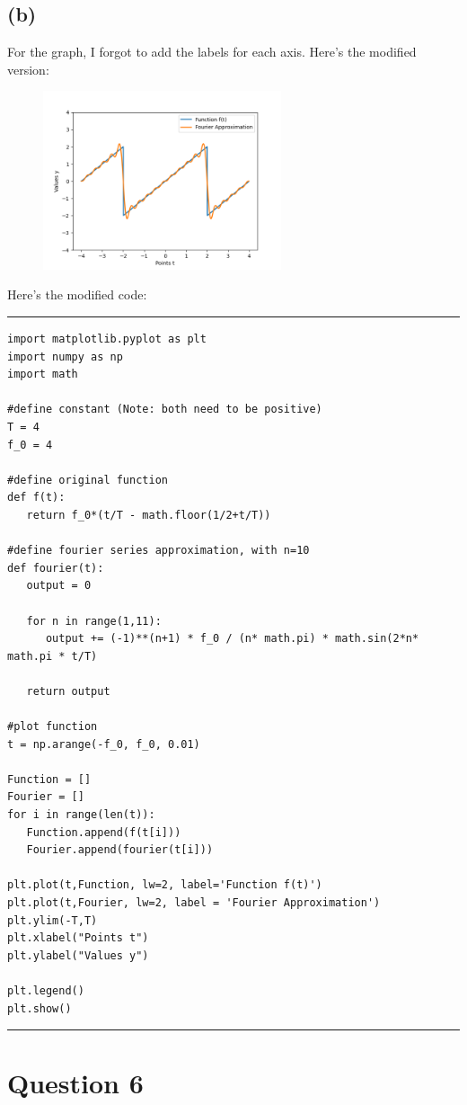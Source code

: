 \documentclass{article}
\begin{document}
\subsection*{(b)}
For the graph, I forgot to add the labels for each axis. Here's the modified version:
\begin{figure}[h!]
    \begin{center}
        \includegraphics[width=70mm]{Figure_1.png}
    \end{center}
\end{figure}
Here's the modified code:
\rule{15.6cm}{0.1mm}
\begin{verbatim}
import matplotlib.pyplot as plt
import numpy as np
import math

#define constant (Note: both need to be positive)
T = 4
f_0 = 4

#define original function
def f(t):
   return f_0*(t/T - math.floor(1/2+t/T))

#define fourier series approximation, with n=10
def fourier(t):
   output = 0

   for n in range(1,11):
      output += (-1)**(n+1) * f_0 / (n* math.pi) * math.sin(2*n* math.pi * t/T)

   return output

#plot function
t = np.arange(-f_0, f_0, 0.01)

Function = []
Fourier = []
for i in range(len(t)):
   Function.append(f(t[i]))
   Fourier.append(fourier(t[i]))

plt.plot(t,Function, lw=2, label='Function f(t)')
plt.plot(t,Fourier, lw=2, label = 'Fourier Approximation')
plt.ylim(-T,T)
plt.xlabel("Points t")
plt.ylabel("Values y")

plt.legend()
plt.show()
\end{verbatim}
\rule{15.6cm}{0.1mm}

\break

\section*{Question 6}
\end{document}
